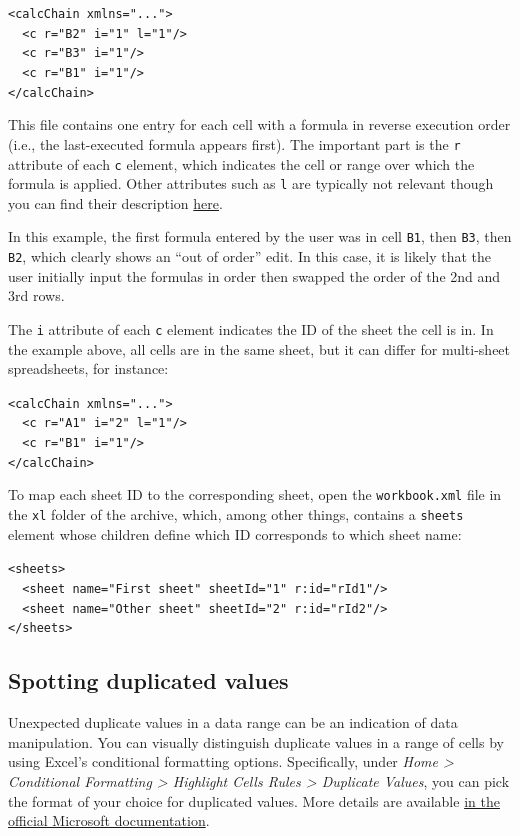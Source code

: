 \documentclass[letterpaper, 12pt]{article}
\begin{document}
\texttt{<calcChain xmlns="...">\\
~~<c r="B2" i="1" l="1"/>\\
~~<c r="B3" i="1"/>\\
~~<c r="B1" i="1"/>\\
</calcChain>}

This file contains one entry for each cell with a formula in reverse execution order (i.e., the last-executed formula appears first). The important part is the \texttt{r} attribute of each \texttt{c} element, which indicates the cell or range over which the formula is applied.
Other attributes such as \texttt{l} are typically not relevant though you can find their description \href{https://learn.microsoft.com/en-us/dotnet/api/documentformat.openxml.spreadsheet.calculationcell}{here}.

In this example, the first formula entered by the user was in cell \texttt{B1}, then \texttt{B3}, then \texttt{B2},
which clearly shows an ``out of order'' edit. In this case, it is likely that the user initially input the formulas in order then swapped the order of the 2nd and 3rd rows.

The \texttt{i} attribute of each \texttt{c} element indicates the ID of the sheet the cell is in.
In the example above, all cells are in the same sheet, but it can differ for multi-sheet spreadsheets, for instance:

\texttt{<calcChain xmlns="...">\\
~~<c r="A1" i="2" l="1"/>\\
~~<c r="B1" i="1"/>\\
</calcChain>}

To map each sheet ID to the corresponding sheet, open the \texttt{workbook.xml} file in the \texttt{xl} folder of the archive,
which, among other things, contains a \texttt{sheets} element whose children define which ID corresponds to which sheet name:

\texttt{<sheets>\\
~~<sheet name="First sheet" sheetId="1" r:id="rId1"/>\\
~~<sheet name="Other sheet" sheetId="2" r:id="rId2"/>\\
</sheets>}

\subsection*{Spotting duplicated values}

Unexpected duplicate values in a data range can be an indication of data manipulation. You can visually distinguish duplicate values in a range of cells by using Excel's conditional formatting options.
Specifically, under \emph{Home > Conditional Formatting > Highlight Cells Rules > Duplicate Values},
you can pick the format of your choice for duplicated values.
More details are available \href{https://support.microsoft.com/en-us/office/find-and-remove-duplicates-00e35bea-b46a-4d5d-b28e-66a552dc138d}{in the official Microsoft documentation}.
\end{document}
